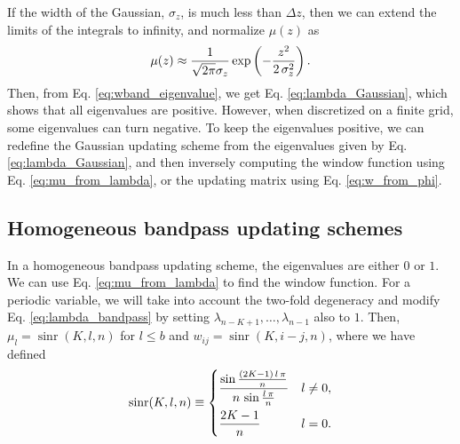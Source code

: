 \documentclass[reprint, superscriptaddress, floatfix]{revtex4-1}
\begin{document}
If the width of the Gaussian, $\sigma_z$,
is much less than $\Delta z$,
then we can extend the limits of the integrals
to infinity, and normalize $\mu(z)$ as
%
\begin{equation}
  \mu(z)
  \approx
  \frac{            1            }
       { \sqrt{ 2 \pi } \sigma_z }
  \exp\left(
        -\frac{   z^2   }
              { 2 \, \sigma_z^2 }
      \right)
  .
\notag
\end{equation}
%
Then, from Eq. \eqref{eq:wband_eigenvalue},
we get Eq. \eqref{eq:lambda_Gaussian},
which shows that all eigenvalues are positive.
%
However,
when discretized on a finite grid,
some eigenvalues can turn negative.
%
To keep the eigenvalues positive,
we can redefine the Gaussian updating scheme
from the eigenvalues given by Eq. \eqref{eq:lambda_Gaussian},
and then inversely computing the window function
using Eq. \eqref{eq:mu_from_lambda},
or the updating matrix using Eq. \eqref{eq:w_from_phi}.




\subsection{\label{sec:homo_bandpass}
Homogeneous bandpass updating schemes}



In a homogeneous bandpass updating scheme,
the eigenvalues are either $0$ or $1$.
%
We can use Eq. \eqref{eq:mu_from_lambda}
to find the window function.
%
For a periodic variable,
we will take into account the two-fold degeneracy
and modify Eq. \eqref{eq:lambda_bandpass}
by setting $\lambda_{n-K+1}, \dots, \lambda_{n-1}$
also to $1$.
%
Then, $\mu_l = \operatorname{sinr}(K, l, n)$ for $l \le b$
and $w_{ij} = \operatorname{sinr}(K, i-j, n)$,
where we have defined
\begin{equation}
  \operatorname{sinr}(K, l, n)
  \equiv
  \begin{dcases}
    \frac{
      \sin
      \frac{ (2 K - 1) \, l \, \pi }
           {              n        }
    }
    {
      n \, \sin \frac{ l \, \pi } { n }
    }
    & l \ne 0, \\
    \frac{2K-1}{n} & l = 0.
  \end{dcases}
\notag
\end{equation}
%
\end{document}
